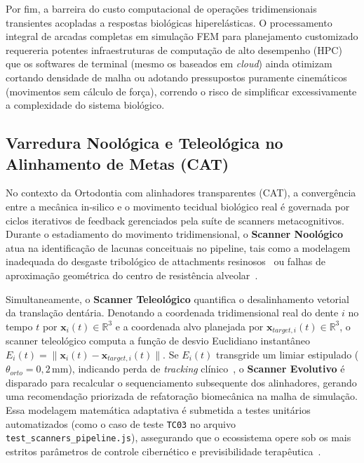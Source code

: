 Por fim, a barreira do custo computacional de operações tridimensionais transientes acopladas a respostas biológicas hiperelásticas. O processamento integral de arcadas completas em simulação FEM para planejamento customizado requereria potentes infraestruturas de computação de alto desempenho (HPC) que os softwares de terminal (mesmo os baseados em \textit{cloud}) ainda otimizam cortando densidade de malha ou adotando pressupostos puramente cinemáticos (movimentos sem cálculo de força), correndo o risco de simplificar excessivamente a complexidade do sistema biológico.

\subsection{Varredura Noológica e Teleológica no Alinhamento de Metas (CAT)}

No contexto da Ortodontia com alinhadores transparentes (CAT), a convergência entre a mecânica in-silico e o movimento tecidual biológico real é governada por ciclos iterativos de feedback gerenciados pela suíte de scanners metacognitivos. Durante o estadiamento do movimento tridimensional, o \textbf{Scanner Noológico} atua na identificação de lacunas conceituais no pipeline, tais como a modelagem inadequada do desgaste tribológico de attachments resinosos~\cite{li2025impacts} ou falhas de aproximação geométrica do centro de resistência alveolar~\cite{zhang2024recursive}.

Simultaneamente, o \textbf{Scanner Teleológico} quantifica o desalinhamento vetorial da translação dentária. Denotando a coordenada tridimensional real do dente $i$ no tempo $t$ por $\bm{x}_i(t) \in \mathbb{R}^3$ e a coordenada alvo planejada por $\bm{x}_{target, i}(t) \in \mathbb{R}^3$, o scanner teleológico computa a função de desvio Euclidiano instantâneo $E_i(t) = \|\bm{x}_i(t) - \bm{x}_{target, i}(t)\|$. Se $E_i(t)$ transgride um limiar estipulado ($\theta_{orto} = 0,2\,\text{mm}$), indicando perda de \textit{tracking} clínico~\cite{li2024aligner}, o \textbf{Scanner Evolutivo} é disparado para recalcular o sequenciamento subsequente dos alinhadores, gerando uma recomendação priorizada de refatoração biomecânica na malha de simulação. Essa modelagem matemática adaptativa é submetida a testes unitários automatizados (como o caso de teste \texttt{TC03} no arquivo \texttt{test\_scanners\_pipeline.js}), assegurando que o ecossistema opere sob os mais estritos parâmetros de controle cibernético e previsibilidade terapêutica~\cite{olawade2026advancing}.
